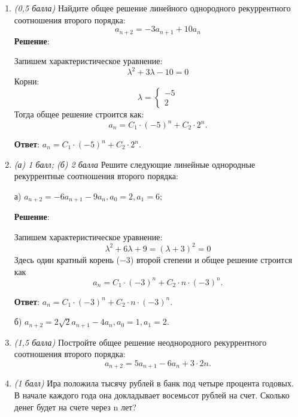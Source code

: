 \documentclass{article}
\begin{document}
  \begin{enumerate}
    \item \textit{(0,5 балла)} Найдите общее решение линейного однородного рекуррентного соотношения второго порядка:
    $$a_{n+2} = -3 a_{n+1} + 10 a_n$$
    \textbf{Решение}:
    
    Запишем характеристическое уравнение:
    \begin{equation}
      \lambda^2 + 3\lambda - 10 = 0
    \end{equation}
    Корни:
    \begin{equation}
      \lambda = \begin{cases}
        -5 \\
        2
      \end{cases}
    \end{equation}
    Тогда общее решение строится как:
    \begin{equation}
      a_n = C_1 \cdot (-5)^n + C_2 \cdot 2^n.
    \end{equation}

    \textbf{Ответ}:
    $a_n = C_1 \cdot (-5)^n + C_2 \cdot 2^n.$

    \item \textit{(а) 1 балл; (б) 2 балла} Решите следующие линейные однородные рекуррентные соотношения второго порядка:
    
    а) $a_{n+2} = -6a_{n+1} - 9a_n, a_0 = 2, a_1 = 6;$

    \textbf{Решение}:

    Запишем характеристическое уравнение:
    \begin{equation}
      \lambda^2 + 6\lambda + 9 = (\lambda + 3)^2 = 0
    \end{equation}
    Здесь один кратный корень ($-3$) второй степени и общее решение строится как
    \begin{equation}
      a_n = C_1 \cdot (-3)^n + C_2 \cdot n \cdot (-3)^n.
    \end{equation}

    \textbf{Ответ}:
    $a_n = C_1 \cdot (-3)^n + C_2 \cdot n \cdot (-3)^n.$
    
    б) $a_{n+2} = 2\sqrt{2}a_{n+1} - 4a_n, a_0 = 1, a_1 = 2.$

    \item \textit{(1,5 балла)} Постройте общее решение неоднородного рекуррентного соотношения второго порядка:
    $$a_{n+2} = 5a_{n+1} - 6a_n + 3 · 2n.$$
    \item \textit{(1 балл)} Ира положила тысячу рублей в банк под четыре процента годовых. В начале каждого года она докладывает восемьсот рублей на счет. Сколько денег будет на счете через n лет?
  \end{enumerate}
\end{document}

